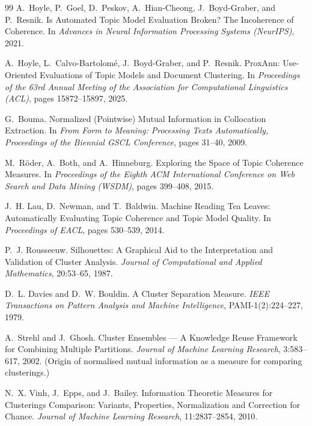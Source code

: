 \begin{thebibliography}{99}
A.~Hoyle, P.~Goel, D.~Peskov, A.~Hian-Cheong, J.~Boyd-Graber, and P.~Resnik.
\newblock Is Automated Topic Model Evaluation Broken? The Incoherence of Coherence.
\newblock In \emph{Advances in Neural Information Processing Systems (NeurIPS)}, 2021.

A.~Hoyle, L.~Calvo-Bartolom\'e, J.~Boyd-Graber, and P.~Resnik.
\newblock ProxAnn: Use-Oriented Evaluations of Topic Models and Document Clustering.
\newblock In \emph{Proceedings of the 63rd Annual Meeting of the Association for Computational
Linguistics (ACL)}, pages 15872--15897, 2025.

G.~Bouma.
\newblock Normalized (Pointwise) Mutual Information in Collocation Extraction.
\newblock In \emph{From Form to Meaning: Processing Texts Automatically, Proceedings of the
Biennial GSCL Conference}, pages 31--40, 2009.

M.~R\"oder, A.~Both, and A.~Hinneburg.
\newblock Exploring the Space of Topic Coherence Measures.
\newblock In \emph{Proceedings of the Eighth ACM International Conference on Web Search and Data
Mining (WSDM)}, pages 399--408, 2015.

J.~H. Lau, D.~Newman, and T.~Baldwin.
\newblock Machine Reading Tea Leaves: Automatically Evaluating Topic Coherence and Topic Model
Quality.
\newblock In \emph{Proceedings of EACL}, pages 530--539, 2014.

P.~J. Rousseeuw.
\newblock Silhouettes: A Graphical Aid to the Interpretation and Validation of Cluster Analysis.
\newblock \emph{Journal of Computational and Applied Mathematics}, 20:53--65, 1987.

D.~L. Davies and D.~W. Bouldin.
\newblock A Cluster Separation Measure.
\newblock \emph{IEEE Transactions on Pattern Analysis and Machine Intelligence},
PAMI-1(2):224--227, 1979.

A.~Strehl and J.~Ghosh.
\newblock Cluster Ensembles --- A Knowledge Reuse Framework for Combining Multiple Partitions.
\newblock \emph{Journal of Machine Learning Research}, 3:583--617, 2002.
\newblock (Origin of normalised mutual information as a measure for comparing clusterings.)

N.~X. Vinh, J.~Epps, and J.~Bailey.
\newblock Information Theoretic Measures for Clusterings Comparison: Variants, Properties,
Normalization and Correction for Chance.
\newblock \emph{Journal of Machine Learning Research}, 11:2837--2854, 2010.


\end{thebibliography}
